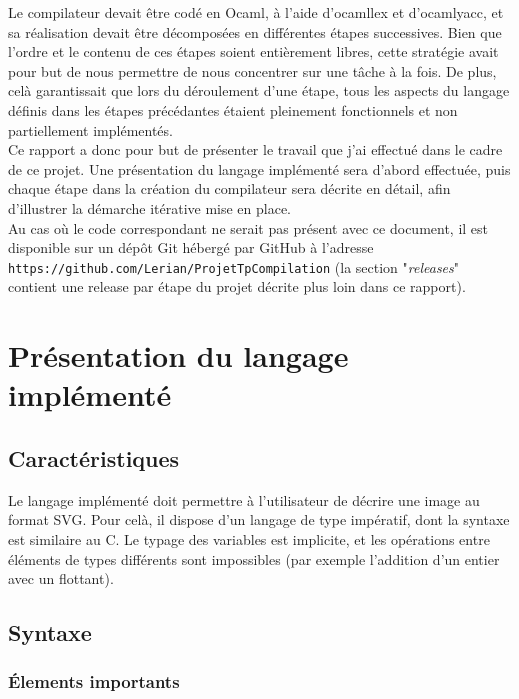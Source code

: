 \documentclass[a4paper, 12pt]{report}
\begin{document}
Le compilateur devait être codé en Ocaml, à l'aide d'ocamllex et d'ocamlyacc, et sa réalisation devait être décomposées en différentes étapes successives. Bien que l'ordre et le contenu de ces étapes soient entièrement libres, cette stratégie avait pour but de nous permettre de nous concentrer sur une tâche à la fois. De plus, celà garantissait que lors du déroulement d'une étape, tous les aspects du langage définis dans les étapes précédantes étaient pleinement fonctionnels et non partiellement implémentés.\\

Ce rapport a donc pour but de présenter le travail que j'ai effectué dans le cadre de ce projet. Une présentation du langage implémenté sera d'abord effectuée, puis chaque étape dans la création du compilateur sera décrite en détail, afin d'illustrer la démarche itérative mise en place.\\

Au cas où le code correspondant ne serait pas présent avec ce document, il est disponible sur un dépôt Git hébergé par GitHub à l'adresse \texttt{https://github.com/Lerian/ProjetTpCompilation} (la section "\textit{releases}" contient une release par étape du projet décrite plus loin dans ce rapport).

\chapter{Présentation du langage implémenté}

	\section{Caractéristiques}
	
	Le langage implémenté doit permettre à l'utilisateur de décrire une image au format SVG. Pour celà, il dispose d'un langage de type impératif, dont la syntaxe est similaire au C. Le typage des variables est implicite, et les opérations entre éléments de types différents sont impossibles (par exemple l'addition d'un entier avec un flottant).
	
	\section{Syntaxe}
	
	\subsection{\'Elements importants}
	
\end{document}
